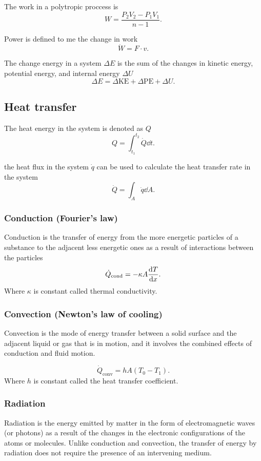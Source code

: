 \documentclass{report}
\begin{document}
The work in a polytropic proccess is
\[
	W = \frac{P_2V_2-P_1V_1}{n-1}
	.\]

Power is defined to me the change in work
\[
	\dot{W} = F\cdot v
	.\]

The change energy in a system $\Delta E$ is the sum of the changes in kinetic energy, potential energy, and internal energy $\Delta U$
\[
	\Delta E = \Delta\text{KE} + \Delta\text{PE} + \Delta U
	.\]

\subsection{Heat transfer}

The heat energy in the system is denoted as $Q$
\[
	Q = \int_{t_1}^{t_2}\dot{Q}\dd{t}
	.\]

the heat flux in the system $\dot{q}$ can be used to calculate the heat transfer rate in the system
\[
	\dot{Q} = \int_A \dot{q}\dd{A}
	.\]

\subsubsection{Conduction (Fourier’s law)}

Conduction is the transfer of energy from the more energetic particles of a substance to the adjacent less energetic ones as a result of interactions between the particles
\[
	\dot{Q}_\text{cond} =-\kappa A \dv{T}{x}
	.\]
Where $\kappa$ is constant called thermal conductivity.

\subsubsection{Convection (Newton’s law of cooling)}
Convection is the mode of energy transfer between a solid surface and the adjacent liquid or gas that is in motion, and it involves the combined effects of conduction and fluid motion.

\[
	\dot{Q}_\text{conv} = hA(T_0-T_1)
	.\]
Where $h$ is constant called the heat transfer coefficient.

\subsubsection{Radiation}
Radiation is the energy emitted by matter in the form of electromagnetic waves (or photons) as a result of the changes in the electronic configurations of the atoms or molecules. Unlike conduction and convection, the transfer of energy by radiation does not require the presence of an intervening medium.
\end{document}
